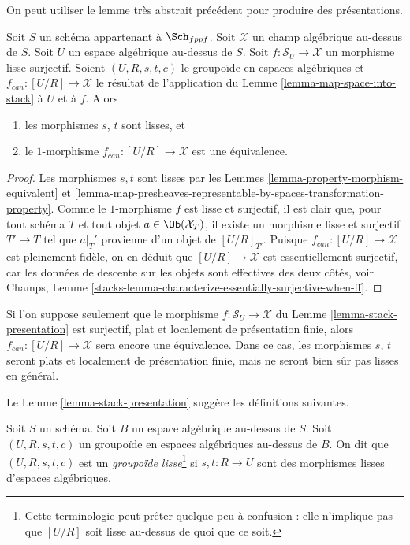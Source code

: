 \noindent
On peut utiliser le lemme très abstrait précédent pour produire des
présentations.

\begin{lemma}
\label{lemma-stack-presentation}
Soit $S$ un schéma appartenant à $\Sch_{fppf}$.
Soit $\mathcal{X}$ un champ algébrique au-dessus de $S$.
Soit $U$ un espace algébrique au-dessus de $S$.
Soit $f : \mathcal{S}_U \to \mathcal{X}$ un morphisme lisse surjectif.
Soient $(U, R, s, t, c)$ le groupoïde en espaces algébriques
et $f_{can} : [U/R] \to \mathcal{X}$ le résultat de l'application du
Lemme \ref{lemma-map-space-into-stack}
à $U$ et à $f$. Alors
\begin{enumerate}
\item les morphismes $s$, $t$ sont lisses, et
\item le $1$-morphisme $f_{can} : [U/R] \to \mathcal{X}$
est une équivalence.
\end{enumerate}
\end{lemma}

\begin{proof}
Les morphismes $s, t$ sont lisses par les
Lemmes \ref{lemma-property-morphism-equivalent} et
\ref{lemma-map-presheaves-representable-by-spaces-transformation-property}.
Comme le $1$-morphisme $f$ est lisse et
surjectif, il est clair que, pour tout schéma $T$ et tout objet
$a \in \Ob(\mathcal{X}_T)$, il existe un morphisme lisse et surjectif
$T' \to T$ tel que $a|_T'$ provienne d'un objet de
$[U/R]_{T'}$. Puisque $f_{can} : [U/R] \to \mathcal{X}$
est pleinement fidèle, on en déduit que
$[U/R] \to \mathcal{X}$ est essentiellement surjectif, car
les données de descente sur les objets sont effectives des deux côtés, voir
Champs, Lemme \ref{stacks-lemma-characterize-essentially-surjective-when-ff}.
\end{proof}

\begin{remark}
\label{remark-flat-fp-presentation}
Si l'on suppose seulement que le morphisme $f : \mathcal{S}_U \to \mathcal{X}$ du
Lemme \ref{lemma-stack-presentation}
est surjectif, plat et localement de présentation finie, alors
$f_{can} : [U/R] \to \mathcal{X}$ sera encore une
équivalence. Dans ce cas, les morphismes $s$, $t$ seront plats et
localement de présentation finie, mais ne seront bien sûr pas lisses en général.
\end{remark}

\noindent
Le Lemme \ref{lemma-stack-presentation}
suggère les définitions suivantes.

\begin{definition}
\label{definition-smooth-groupoid}
Soit $S$ un schéma. Soit $B$ un espace algébrique au-dessus de $S$.
Soit $(U, R, s, t, c)$ un groupoïde en espaces algébriques au-dessus de $B$.
On dit que $(U, R, s, t, c)$ est un {\it groupoïde lisse}\footnote{Cette terminologie
peut prêter quelque peu à confusion : elle n'implique pas que $[U/R]$ soit lisse
au-dessus de quoi que ce soit.}
si $s, t : R \to U$ sont des morphismes lisses d'espaces algébriques.
\end{definition}

